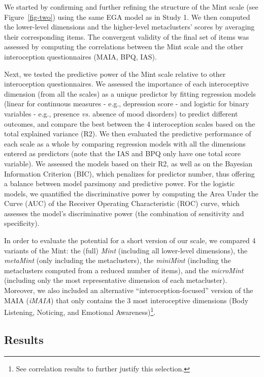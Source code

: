 \documentclass[
  jou,
  floatsintext,
  longtable,
  nolmodern,
  notxfonts,
  notimes,
  colorlinks=true,linkcolor=blue,citecolor=blue,urlcolor=blue]{apa7}
\begin{document}
We started by confirming and further refining the structure of the Mint
scale (see Figure~\ref{fig-two}) using the same EGA model as in Study 1.
We then computed the lower-level dimensions and the higher-level
metaclusters' scores by averaging their corresponding items. The
convergent validity of the final set of items was assessed by computing
the correlations between the Mint scale and the other interoception
questionnaires (MAIA, BPQ, IAS).

Next, we tested the predictive power of the Mint scale relative to other
interoception questionnaires. We assessed the importance of each
interoceptive dimension (from all the scales) as a unique predictor by
fitting regression models (linear for continuous measures - e.g.,
depression score - and logistic for binary variables - e.g., presence
\emph{vs.} absence of mood disorders) to predict different outcomes, and
compare the best between the 4 interoception scales based on the total
explained variance (R2). We then evaluated the predictive performance of
each scale as a whole by comparing regression models with all the
dimensions entered as predictors (note that the IAS and BPQ only have
one total score variable). We assessed the models based on their R2, as
well as on the Bayesian Information Criterion (BIC), which penalizes for
predictor number, thus offering a balance between model parsimony and
predictive power. For the logistic models, we quantified the
discriminative power by computing the Area Under the Curve (AUC) of the
Receiver Operating Characteristic (ROC) curve, which assesses the
model's discriminative power (the combination of sensitivity and
specificity).

In order to evaluate the potential for a short version of our scale, we
compared 4 variants of the Mint: the (full) \emph{Mint} (including all
lower-level dimensions), the \emph{metaMint} (only including the
metaclusters), the \emph{miniMint} (including the metaclusters computed
from a reduced number of items), and the \emph{microMint} (including
only the most representative dimension of each metacluster). Moreover,
we also included an alternative ``interoception-focused'' version of the
MAIA (\emph{iMAIA}) that only contains the 3 most interoceptive
dimensions (Body Listening, Noticing, and Emotional
Awareness)\footnote{See correlation results to further justify this
  selection.}.

\subsection{Results}\label{results-1}
\end{document}
